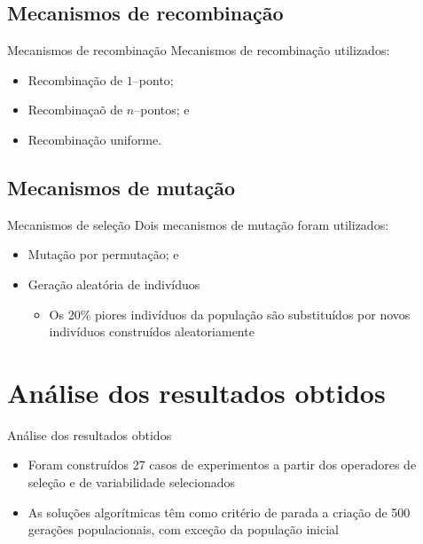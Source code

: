 \documentclass{beamer}
\begin{document}
\subsection{Mecanismos de recombinação}
\begin{frame}{Mecanismos de recombinação}
Mecanismos de recombinação utilizados:
\begin{itemize}
\item<1-> Recombinação de $1$--ponto;
\item<2-> Recombinaçaõ de $n$--pontos; e
\item<3-> Recombinação uniforme.
\end{itemize}
\end{frame}

\subsection{Mecanismos de mutação}
\begin{frame}{Mecanismos de seleção}
Dois mecanismos de mutação foram utilizados:
\begin{itemize}
\item<1-> Mutação por permutação; e
\item<2-> Geração aleatória de indivíduos
\begin{itemize}
\item<3-> Os 20\% piores indivíduos da população são substituídos por novos indivíduos construídos aleatoriamente
\end{itemize}
\end{itemize}
\end{frame}

\section{Análise dos resultados obtidos}
\begin{frame}{Análise dos resultados obtidos}
\begin{itemize}
\item<1-> Foram construídos 27 casos de experimentos a partir dos operadores de seleção e de variabilidade selecionados
\item<2-> As soluções algorítmicas têm como critério de parada a criação de 500 gerações populacionais, com exceção da população inicial
\end{itemize}
\end{frame}
\end{document}
